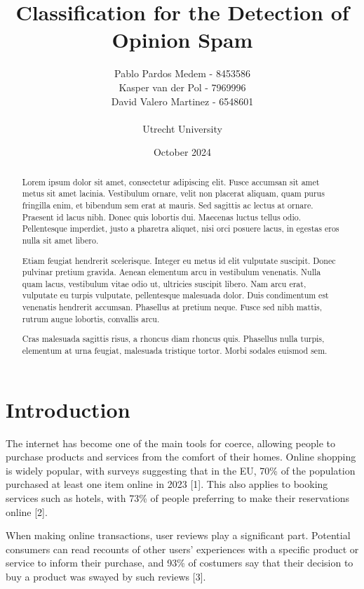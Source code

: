 \documentclass[a4paper,11pt]{article}
\title{\vspace{-1cm}Classification for the Detection of Opinion Spam}
\author{Pablo Pardos Medem - 8453586\\ Kasper van der Pol - 7969996\\ David Valero Martinez - 6548601\\\\
Utrecht University}
\date{October 2024}
\begin{document}
\maketitle



\begin{abstract}

Lorem ipsum dolor sit amet, consectetur adipiscing elit. Fusce accumsan sit amet metus sit amet lacinia. Vestibulum ornare, velit non placerat aliquam, quam purus fringilla enim, et bibendum sem erat at mauris. Sed sagittis ac lectus at ornare. Praesent id lacus nibh. Donec quis lobortis dui. Maecenas luctus tellus odio. Pellentesque imperdiet, justo a pharetra aliquet, nisi orci posuere lacus, in egestas eros nulla sit amet libero.

Etiam feugiat hendrerit scelerisque. Integer eu metus id elit vulputate suscipit. Donec pulvinar pretium gravida. Aenean elementum arcu in vestibulum venenatis. Nulla quam lacus, vestibulum vitae odio ut, ultricies suscipit libero. Nam arcu erat, vulputate eu turpis vulputate, pellentesque malesuada dolor. Duis condimentum est venenatis hendrerit accumsan. Phasellus at pretium neque. Fusce sed nibh mattis, rutrum augue lobortis, convallis arcu.

Cras malesuada sagittis risus, a rhoncus diam rhoncus quis. Phasellus nulla turpis, elementum at urna feugiat, malesuada tristique tortor. Morbi sodales euismod sem.

\end{abstract}

\newpage

\section{Introduction}

The internet has become one of the main tools for coerce, allowing people to purchase products and services from the comfort of their homes. Online shopping is widely popular, with surveys suggesting that in the EU, 70\% of the population purchased at least one item online in 2023 [1]. This also applies to booking services such as hotels, with 73\% of people preferring to make their reservations online [2]. 

When making online transactions, user reviews play a significant part. Potential consumers can read recounts of other users' experiences with a specific product or service to inform their purchase, and 93\% of costumers say that their decision to buy a product was swayed by such reviews [3].  
\end{document}

